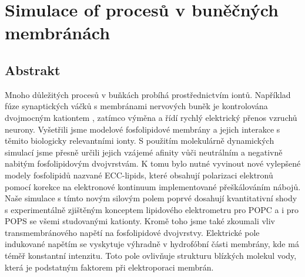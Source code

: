 \documentclass[12pt,a4paper]{report}
\begin{document}
\chapter*{Simulace of procesů v buněčných membránách}

\section*{Abstrakt}

Mnoho důležitých procesů v buňkách probíhá prostřednictvím iontů.
Například fúze synaptických váčků s membránami nervových buněk 
je kontrolována dvojmocným kationtem ,
zatímco výměna  a 
řídí rychlý elektrický přenos vzruchů neurony.  
Vyšetřili jsme modelov{\'e} fosfolipidov{\'e} membrány a jejich interakce
s těmito biologicky relevantními ionty. 
S použitím molekulárně dynamických simulací
jsme přesně určili jejich vzájem{\'e} afinity 
vůči neutrálním a negativně nabitým fosfolipidovým dvojvrstvám. 
K tomu bylo nutn{\'e} vyvinout
nov{\'e} vylepšen{\'e} modely fosfolipidů nazvan{\'e} ECC-lipids,
kter{\'e} obsahují polarizaci elektronů 
pomocí korekce na elektronov{\'e} kontinuum implementovan{\'e} přeškálováním nábojů.
Naše simulace s tímto novým silovým polem 
poprv{\'e} dosahují kvantitativní shody 
s experimentálně zjištěným konceptem lipidov{\'e}ho elektrometru
pro POPC a i pro POPS se všemi studovanými kationty. 
Kromě toho jsme tak{\'e} zkoumali vliv transmembránov{\'e}ho napětí na fosfolipidov{\'e} dvojvrstvy.  
Elektrick{\'e} pole indukovan{\'e} napětím se vyskytuje
výhradně v hydrofóbní části membrány, 
kde má t{\'e}měř konstantní intenzitu. 
Toto pole ovlivňuje strukturu blízkých molekul vody, 
která je podstatným faktorem při elektroporaci membrán. 
\end{document}
